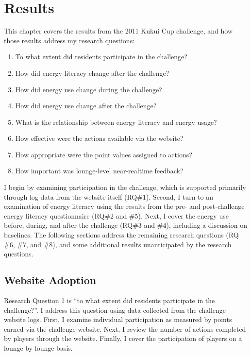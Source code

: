 \chapter{Results}
\label{cha:results}

This chapter covers the results from the 2011 Kukui Cup challenge, and how those results address my research questions:

\begin{enumerate}
	\item To what extent did residents participate in the challenge?
	\item How did energy literacy change after the challenge?
	\item How did energy use change during the challenge?
	\item How did energy use change after the challenge?
	\item What is the relationship between energy literacy and energy usage?
	\item How effective were the actions available via the website?
	\item How appropriate were the point values assigned to actions?
	\item How important was lounge-level near-realtime feedback?
\end{enumerate}

I begin by examining participation in the challenge, which is supported primarily through log data from the website itself (RQ\#1). Second, I turn to an examination of energy literacy using the results from the pre- and post-challenge energy literacy questionnaire (RQ\#2 and \#5). Next, I cover the energy use before, during, and after the challenge (RQ\#3 and \#4), including a discussion on baselines. The following sections address the remaining research questions (RQ \#6, \#7, and \#8), and some additional results unanticipated by the research questions.


\section{Website Adoption}

Research Question 1 is ``to what extent did residents participate in the challenge?''. I address this question using data collected from the challenge website logs. First, I examine individual participation as measured by points earned via the challenge website. Next, I review the number of actions completed by players through the website. Finally, I cover the participation of players on a lounge by lounge basis.

